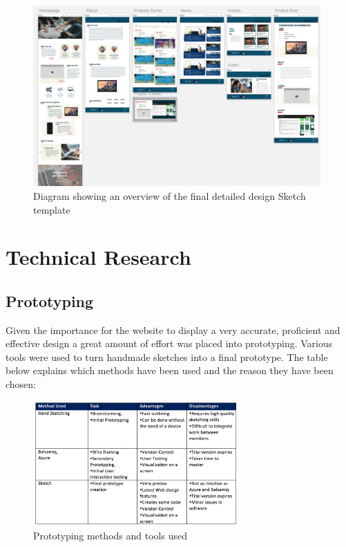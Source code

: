 \documentclass[fontsize=10pt]{extarticle}
\numberwithin{figure}{section} %
\begin{document}
\begin{figure}[H]
\centering
\includegraphics[trim = 0 0 0 0, clip, width=0.98\textwidth]{SketchDD.png}
\caption{Diagram showing an overview of the final detailed design Sketch template}
\label{sketchdd}
\end{figure}

\hypertarget{technical-research}{%
\section{Technical Research}\label{technical-research}}

\hypertarget{prototyping}{%
\subsection{Prototyping}\label{prototyping}}

Given the importance for the website to display a very accurate,
proficient and effective design a great amount of effort was placed into
prototyping. Various tools were used to turn handmade sketches into a
final prototype. The table below explains which methods have been used
and the reason they have been chosen:

\begin{figure}[H]
      \centering
      \includegraphics[trim = 0 0 0 0, clip, width=0.7\textwidth]{ph19.png}
      \caption{Prototyping methods and tools used}
 \end{figure}
\end{document}
